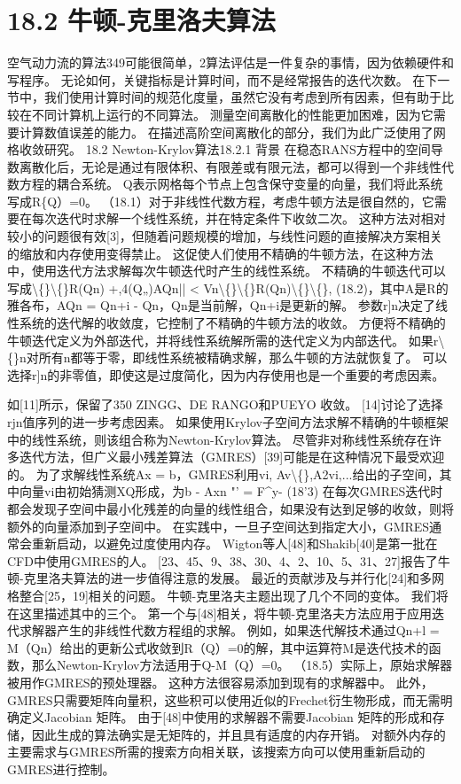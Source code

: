 \documentclass[UTF8,11pt,a4paper,openany,fontset=fandol]{ctexbook}
\begin{document}
\section{18.2 牛顿-克里洛夫算法}
空气动力流的算法349可能很简单，2算法评估是一件复杂的事情，因为依赖硬件和写程序。 无论如何，关键指标是计算时间，而不是经常报告的迭代次数。 在下一节中，我们使用计算时间的规范化度量，虽然它没有考虑到所有因素，但有助于比较在不同计算机上运行的不同算法。 测量空间离散化的性能更加困难，因为它需要计算数值误差的能力。 在描述高阶空间离散化的部分，我们为此广泛使用了网格收敛研究。 18.2 Newton-Krylov算法18.2.1 背景 在稳态RANS方程中的空间导数离散化后，无论是通过有限体积、有限差或有限元法，都可以得到一个非线性代数方程的耦合系统。 Q表示网格每个节点上包含保守变量的向量，我们将此系统写成R\{Q）=0。 （18.1）对于非线性代数方程，考虑牛顿方法是很自然的，它需要在每次迭代时求解一个线性系统，并在特定条件下收敛二次。 这种方法对相对较小的问题很有效[3]，但随着问题规模的增加，与线性问题的直接解决方案相关的缩放和内存使用变得禁止。 这促使人们使用不精确的牛顿方法，在这种方法中，使用迭代方法求解每次牛顿迭代时产生的线性系统。 不精确的牛顿迭代可以写成\textbackslash\{\}\textbackslash\{\}R(Qn) +,4(Q„)AQn|| < Vn\textbackslash\{\}\textbackslash\{\}R(Qn)\textbackslash\{\}\textbackslash\{\}, (18.2)，其中A是R的雅各布，AQn = Qn+i - Qn，Qn是当前解，Qn+i是更新的解。 参数r]n决定了线性系统的迭代解的收敛度，它控制了不精确的牛顿方法的收敛。 方便将不精确的牛顿迭代定义为外部迭代，并将线性系统解所需的迭代定义为内部迭代。 如果r\textbackslash\{\}n对所有n都等于零，即线性系统被精确求解，那么牛顿的方法就恢复了。 可以选择r]n的非零值，即使这是过度简化，因为内存使用也是一个重要的考虑因素。

如[11]所示，保留了350 ZINGG、DE RANGO和PUEYO 收敛。 [14]讨论了选择rjn值序列的进一步考虑因素。 如果使用Krylov子空间方法求解不精确的牛顿框架中的线性系统，则该组合称为Newton-Krylov算法。 尽管非对称线性系统存在许多迭代方法，但广义最小残差算法（GMRES）[39]可能是在这种情况下最受欢迎的。 为了求解线性系统Ax = b，GMRES利用vi, Av\textbackslash\{\},A2vi,...给出的子空间，其中向量vi由初始猜测XQ形成，为b - Axn "' = F\textasciicircum{}y- (18'3) 在每次GMRES迭代时都会发现子空间中最小化残差的向量的线性组合，如果没有达到足够的收敛，则将额外的向量添加到子空间中。 在实践中，一旦子空间达到指定大小，GMRES通常会重新启动，以避免过度使用内存。 Wigton等人[48]和Shakib[40]是第一批在CFD中使用GMRES的人。 [23、45、9、38、30、4、2、10、5、31、27]报告了牛顿-克里洛夫算法的进一步值得注意的发展。 最近的贡献涉及与并行化[24]和多网格整合[25，19]相关的问题。 牛顿-克里洛夫主题出现了几个不同的变体。 我们将在这里描述其中的三个。 第一个与[48]相关，将牛顿-克里洛夫方法应用于应用迭代求解器产生的非线性代数方程组的求解。 例如，如果迭代解技术通过Qn+l = M（Qn）给出的更新公式收敛到R（Q）=0的解，其中运算符M是迭代技术的函数，那么Newton-Krylov方法适用于Q-M（Q）=0。 （18.5）实际上，原始求解器被用作GMRES的预处理器。 这种方法很容易添加到现有的求解器中。 此外，GMRES只需要矩阵向量积，这些积可以使用近似的Frechet衍生物形成，而无需明确定义Jacobian 矩阵。 由于[48]中使用的求解器不需要Jacobian 矩阵的形成和存储，因此生成的算法确实是无矩阵的，并且具有适度的内存开销。 对额外内存的主要需求与GMRES所需的搜索方向相关联，该搜索方向可以使用重新启动的GMRES进行控制。
\end{document}

